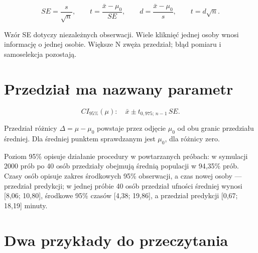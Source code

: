 \documentclass[
  polish,
  11pt,
  a4paper,
]{article}
\begin{document}
\[
SE=\frac{s}{\sqrt n},\qquad
t=\frac{\bar{x}-\mu_0}{SE},\qquad
d=\frac{\bar{x}-\mu_0}{s},\qquad t=d\sqrt{n}.
\]

Wzór SE dotyczy niezależnych obserwacji. Wiele kliknięć jednej osoby
wnosi informację o jednej osobie. Większe N zwęża przedział; błąd
pomiaru i samoselekcja pozostają.

\section{Przedział ma nazwany
parametr}\label{przedziaux142-ma-nazwany-parametr}

\[CI_{95\%}(\mu):\quad\bar{x}\pm t_{0{,}975;\,n-1}\,SE.\]

Przedział różnicy \(\Delta=\mu-\mu_0\) powstaje przez odjęcie \(\mu_0\)
od obu granic przedziału średniej. Dla średniej punktem sprawdzanym jest
\(\mu_0\), dla różnicy zero.

Poziom 95\% opisuje działanie procedury w powtarzanych próbach: w
symulacji 2000 prób po 40 osób przedziały obejmują średnią populacji w
94,35\% prób. Czasy osób opisuje zakres środkowych 95\% obserwacji, a
czas nowej osoby --- przedział predykcji; w jednej próbie 40 osób
przedział ufności średniej wynosi {[}8,06; 10,80{]}, środkowe 95\%
czasów {[}4,38; 19,86{]}, a przedział predykcji {[}0,67; 18,19{]}
minuty.

\section{Dwa przykłady do
przeczytania}\label{dwa-przykux142ady-do-przeczytania}
\end{document}
